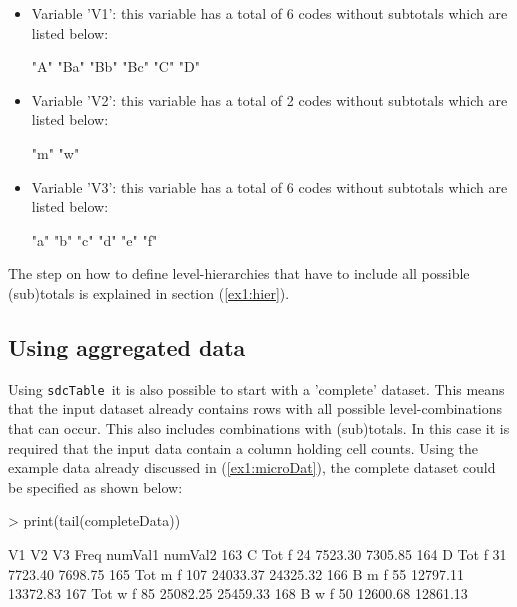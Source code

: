 \documentclass{article}
\newcommand{\sdcTable}{{\tt sdcTable}}
\begin{document}
\begin{itemize}
	\item Variable 'V1': this variable has a total of 6 
	codes without subtotals which are listed below:
\begin{Schunk}
\begin{Soutput}
[1] "A"  "Ba" "Bb" "Bc" "C"  "D" 
\end{Soutput}
\end{Schunk}
	\item Variable 'V2': this variable has a total of 2 
	codes without subtotals which are listed below:
\begin{Schunk}
\begin{Soutput}
[1] "m" "w"
\end{Soutput}
\end{Schunk}
	\item Variable 'V3': this variable has a total of 6 
	codes without subtotals which are listed below:
\begin{Schunk}
\begin{Soutput}
[1] "a" "b" "c" "d" "e" "f"
\end{Soutput}
\end{Schunk}
\end{itemize}

The step on how to define level-hierarchies that have to include all possible
(sub)totals is explained in section (\ref{ex1:hier}).

\subsection{Using aggregated data}\label{ex1:aggDat}
Using \sdcTable~it is also possible to start with a 'complete' dataset. This 
means that the input dataset already contains rows with all possible level-combinations
that can occur. This also includes combinations with (sub)totals. In this case
it is required that the input data contain a column holding cell counts. Using the
example data already discussed in (\ref{ex1:microDat}), the complete dataset could
be specified as shown below:

\begin{Schunk}
\begin{Sinput}
> print(tail(completeData))
\end{Sinput}
\begin{Soutput}
     V1  V2 V3 Freq  numVal1  numVal2
163   C Tot  f   24  7523.30  7305.85
164   D Tot  f   31  7723.40  7698.75
165 Tot   m  f  107 24033.37 24325.32
166   B   m  f   55 12797.11 13372.83
167 Tot   w  f   85 25082.25 25459.33
168   B   w  f   50 12600.68 12861.13
\end{Soutput}
\end{Schunk}
\end{document}
